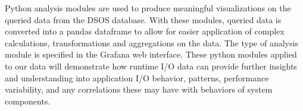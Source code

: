 Python analysis modules are used to produce meaningful visualizations on the queried 
data from the DSOS database. With these modules, queried data is converted into a 
pandas dataframe to allow for easier application of complex calculations, transformations 
and aggregations on the data. The type of analysis module is specified in the Grafana 
web interface. These python modules applied to our \Darshan{} data will demonstrate 
how runtime I/O data can provide further insights and understanding into application 
I/O behavior, patterns, performance variability, and any correlations these may have with 
behaviors of system components.   


